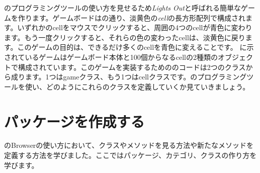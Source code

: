 \documentclass[a4paper,10pt,twoside]{book}
\begin{document}
\pharo のプログラミングツールの使い方を見せるため\emph{Lights Out}と呼ばれる簡単なゲームを作ります。ゲームボードはの通り、淡黄色の\emph{cell}の長方形配列で構成されます。いずれかのcellをマウスでクリックすると、周囲の4つのcellが青色に変わります。もう一度クリックすると、それらの色の変わったcellは、淡黄色に戻ります。このゲームの目的は、できるだけ多くのcellを青色に変えることです。
に示されているゲームはゲームボード本体と100個からなるcellの2種類のオブジェクトで構成されています。このゲームを実装するための\pharo のコードは2つのクラスから成ります。1つはgameクラス、もう1つはcellクラスです。\pharo のプログラミングツールを使い、どのようにこれらのクラスを定義していくか見ていきましょう。

\section{パッケージを作成する}

のBrowserの使い方において、クラスやメソッドを見る方法や新たなメソッドを定義する方法を学びました。ここではパッケージ、カテゴリ、クラスの作り方を学びます。

\end{document}
